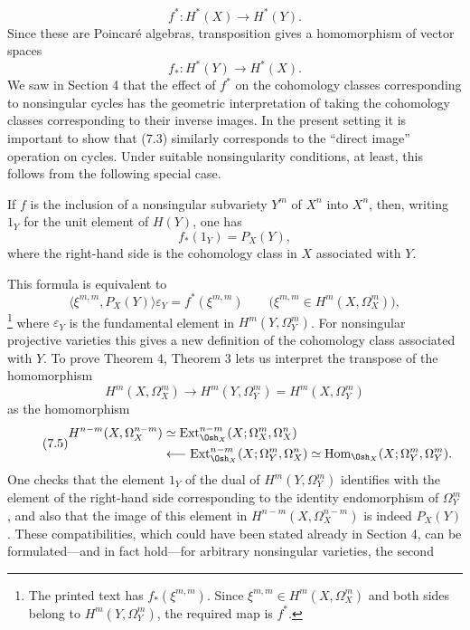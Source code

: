 \begin{equation}\tag{7.2}
  f^{*}:H^{*}(X)\longrightarrow H^{*}(Y).
\end{equation}
Since these are Poincaré algebras, transposition gives a homomorphism of vector
spaces
\begin{equation}\tag{7.3}
  f_{*}:H^{*}(Y)\longrightarrow H^{*}(X).
\end{equation}
We saw in Section 4 that the effect of $f^{*}$ on the cohomology classes
corresponding to nonsingular cycles has the geometric interpretation of taking
the cohomology classes corresponding to their inverse images. In the present
setting it is important to show that (7.3) similarly corresponds to the
``direct image'' operation on cycles. Under suitable nonsingularity conditions,
at least, this follows from the following special case.

 If $f$ is the inclusion of a nonsingular subvariety $Y^{m}$
of $X^{n}$ into $X^{n}$, then, writing $1_Y$ for the unit element of $H(Y)$,
one has
\begin{equation}\tag{7.4}
  f_{*}(1_Y)=P_X(Y),
\end{equation}
where the right-hand side is the cohomology class in $X$ associated with $Y$.

This formula is equivalent to
\begin{equation}\tag{7.4 bis}
  \bigl\langle\xi^{m,m},P_X(Y)\bigr\rangle\varepsilon_Y
  =f^{*}(\xi^{m,m})
  \qquad
  \bigl(\xi^{m,m}\in H^{m}(X,\Omega_X^{m})\bigr),
\end{equation}
\footnote{The printed text has $f_{*}(\xi^{m,m})$. Since
$\xi^{m,m}\in H^{m}(X,\Omega_X^{m})$ and both sides belong to
$H^{m}(Y,\Omega_Y^{m})$, the required map is $f^{*}$.} where $\varepsilon_Y$ is
the fundamental element in $H^{m}(Y,\Omega_Y^{m})$. For nonsingular projective
varieties this gives a new definition of the cohomology class associated with
$Y$. To prove Theorem 4, Theorem 3 lets us interpret the transpose of the
homomorphism
\[
  H^{m}(X,\Omega_X^{m})
  \longrightarrow H^{m}(Y,\Omega_Y^{m})
  =H^{m}(X,\Omega_Y^{m})
\]
as the homomorphism
\begin{equation}\tag{7.5}
\begin{split}
  H^{n-m}(X,\Omega_X^{n-m})
  &\simeq
  \operatorname{Ext}_{\Osh_X}^{n-m}(X;\Omega_X^{m},\Omega_X^{n})\\
  &\longleftarrow
  \operatorname{Ext}_{\Osh_X}^{n-m}(X;\Omega_Y^{m},\Omega_X^{n})
  \simeq
  \operatorname{Hom}_{\Osh_X}(X;\Omega_Y^{m},\Omega_Y^{m}).
\end{split}
\end{equation}
One checks that the element $1_Y$ of the dual of
$H^{m}(Y,\Omega_Y^{m})$ identifies with the element of the right-hand side
corresponding to the identity endomorphism of $\Omega_Y^{m}$, and also that the
image of this element in $H^{n-m}(X,\Omega_X^{n-m})$ is indeed $P_X(Y)$. These
compatibilities, which could have been stated already in Section 4, can be
formulated---and in fact hold---for arbitrary nonsingular varieties, the second

